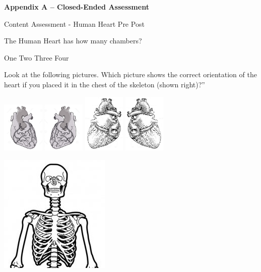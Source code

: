 \documentclass[11.5pt]{exam}
\begin{document}
\textbf{Appendix A – Closed-Ended Assessment}

\justifying
Content Assessment - Human Heart \hspace{3.5in} Pre Post
\RaggedRight
\begin{questions}
\question The Human Heart has how many chambers?

\begin{oneparchoices}
 \choice One
 \choice Two
 \choice Three
 \choice Four
\end{oneparchoices}

\question Look at the following pictures. Which picture shows the correct orientation of the heart if you placed it in the chest of the skeleton (shown right)?”

\begin{oneparchoices}
 \choice \includegraphics[width=2cm]{quiz/heartA.png}
 \choice \includegraphics[width=2cm]{quiz/heartB.jpg}
 \choice \includegraphics[width=2cm]{quiz/heartC.jpg}
 \choice \includegraphics[width=2cm]{quiz/heartD.jpg}
\end{oneparchoices}
\hspace{1cm}
\includegraphics[]{quiz/skeleton.jpg}


\end{questions}
\end{document}
